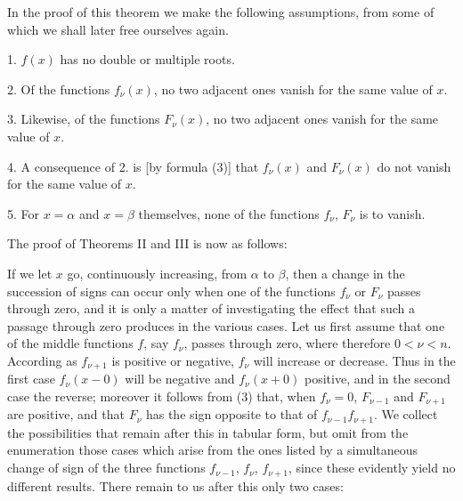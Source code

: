 
In the proof of this theorem we make the following assumptions, from
some of which we shall later free ourselves again.

1. $f(x)$ has no double or multiple roots.

2. Of the functions $f_\nu(x)$, no two adjacent ones vanish for
the same value of $x$.

3. Likewise, of the functions $F_\nu(x)$, no two adjacent ones vanish
for the same value of $x$.

4. A consequence of 2. is [by formula (3)] that $f_\nu(x)$ and
$F_\nu(x)$ do not vanish for the same value of $x$.

5. For $x = \alpha$ and $x = \beta$ themselves, none of the functions
$f_\nu$, $F_\nu$ is to vanish.

The proof of Theorems II and III is now as follows:

If we let $x$ go, continuously increasing, from $\alpha$ to $\beta$,
then a change in the succession of signs can occur only when one of the
functions $f_\nu$ or $F_\nu$ passes through zero, and it is only a
matter of investigating the effect that such a passage through zero
produces in the various cases. Let us first assume that one of the
middle functions $f$, say $f_\nu$, passes through zero, where
therefore $0 < \nu < n$. According as $f_{\nu+1}$ is positive or negative,
$f_\nu$ will increase or decrease. Thus in the first case
$f_\nu(x - 0)$ will be negative and $f_\nu(x + 0)$ positive, and in the
second case the reverse; moreover it follows from (3) that, when $f_\nu = 0$,
$F_{\nu-1}$ and $F_{\nu+1}$ are positive, and that $F_\nu$ has the
sign opposite to that of $f_{\nu-1} f_{\nu+1}$. We collect
the possibilities that remain after this in tabular form, but omit
from the enumeration those cases which arise from the ones listed by a
simultaneous change of sign of the three functions $f_{\nu-1}$, $f_\nu$,
$f_{\nu+1}$, since these evidently yield no
different results. There remain to us after this only two
cases:

